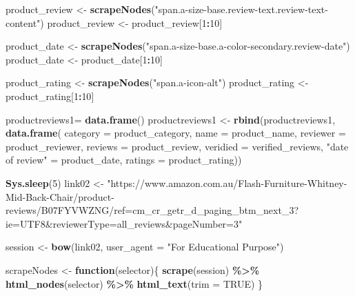 \documentclass[
]{article}
\newenvironment{Shaded}{\begin{snugshade}}{\end{snugshade}}
\newcommand{\AttributeTok}[1]{\textcolor[rgb]{0.13,0.29,0.53}{#1}}
\newcommand{\ConstantTok}[1]{\textcolor[rgb]{0.56,0.35,0.01}{#1}}
\newcommand{\ControlFlowTok}[1]{\textcolor[rgb]{0.13,0.29,0.53}{\textbf{#1}}}
\newcommand{\DecValTok}[1]{\textcolor[rgb]{0.00,0.00,0.81}{#1}}
\newcommand{\FunctionTok}[1]{\textcolor[rgb]{0.13,0.29,0.53}{\textbf{#1}}}
\newcommand{\NormalTok}[1]{#1}
\newcommand{\OtherTok}[1]{\textcolor[rgb]{0.56,0.35,0.01}{#1}}
\newcommand{\SpecialCharTok}[1]{\textcolor[rgb]{0.81,0.36,0.00}{\textbf{#1}}}
\newcommand{\StringTok}[1]{\textcolor[rgb]{0.31,0.60,0.02}{#1}}
\begin{document}
\begin{Shaded}
\begin{Highlighting}[]
\NormalTok{  product\_review }\OtherTok{\textless{}{-}} \FunctionTok{scrapeNodes}\NormalTok{(}\StringTok{"span.a{-}size{-}base.review{-}text.review{-}text{-}content"}\NormalTok{)}
\NormalTok{  product\_review }\OtherTok{\textless{}{-}}\NormalTok{ product\_review[}\DecValTok{1}\SpecialCharTok{:}\DecValTok{10}\NormalTok{]}
  
\NormalTok{  product\_date }\OtherTok{\textless{}{-}} \FunctionTok{scrapeNodes}\NormalTok{(}\StringTok{"span.a{-}size{-}base.a{-}color{-}secondary.review{-}date"}\NormalTok{)}
\NormalTok{  product\_date }\OtherTok{\textless{}{-}}\NormalTok{ product\_date[}\DecValTok{1}\SpecialCharTok{:}\DecValTok{10}\NormalTok{]}
  
\NormalTok{  product\_rating }\OtherTok{\textless{}{-}} \FunctionTok{scrapeNodes}\NormalTok{(}\StringTok{"span.a{-}icon{-}alt"}\NormalTok{)}
\NormalTok{  product\_rating }\OtherTok{\textless{}{-}}\NormalTok{ product\_rating[}\DecValTok{1}\SpecialCharTok{:}\DecValTok{10}\NormalTok{]}
  
\NormalTok{  productreviews1}\OtherTok{=} \FunctionTok{data.frame}\NormalTok{()}
\NormalTok{  productreviews1 }\OtherTok{\textless{}{-}} \FunctionTok{rbind}\NormalTok{(productreviews1, }\FunctionTok{data.frame}\NormalTok{(}
                      \AttributeTok{category =}\NormalTok{ product\_category,}
                      \AttributeTok{name =}\NormalTok{ product\_name,}
                      \AttributeTok{reviewer =}\NormalTok{ product\_reviewer,}
                      \AttributeTok{reviews =}\NormalTok{ product\_review,}
                      \AttributeTok{veridied =}\NormalTok{ verified\_reviews,}
                      \StringTok{"date of review"} \OtherTok{=}\NormalTok{ product\_date,}
                      \AttributeTok{ratings =}\NormalTok{ product\_rating))}

  

  \FunctionTok{Sys.sleep}\NormalTok{(}\DecValTok{5}\NormalTok{)}
\NormalTok{link02 }\OtherTok{\textless{}{-}} \StringTok{"https://www.amazon.com.au/Flash{-}Furniture{-}Whitney{-}Mid{-}Back{-}Chair/product{-}reviews/B07FYVWZNG/ref=cm\_cr\_getr\_d\_paging\_btm\_next\_3?ie=UTF8\&reviewerType=all\_reviews\&pageNumber=3"}


\NormalTok{  session }\OtherTok{\textless{}{-}} \FunctionTok{bow}\NormalTok{(link02,}
               \AttributeTok{user\_agent =} \StringTok{"For Educational Purpose"}\NormalTok{)}

\NormalTok{  scrapeNodes }\OtherTok{\textless{}{-}} \ControlFlowTok{function}\NormalTok{(selector)\{}
    \FunctionTok{scrape}\NormalTok{(session) }\SpecialCharTok{\%\textgreater{}\%}
      \FunctionTok{html\_nodes}\NormalTok{(selector) }\SpecialCharTok{\%\textgreater{}\%}
      \FunctionTok{html\_text}\NormalTok{(}\AttributeTok{trim =} \ConstantTok{TRUE}\NormalTok{)}
\NormalTok{  \}}


\end{Highlighting}
\end{Shaded}
\end{document}
